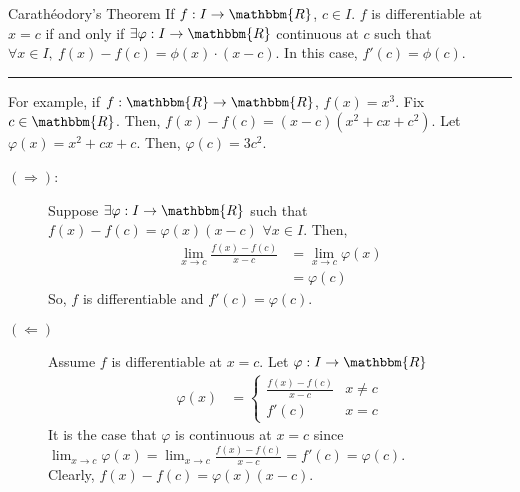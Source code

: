 \documentclass[10pt]{extarticle}
\newcommand{\R}{\mathbbm{R}}
\begin{document}
  \begin{problem}{Carathéodory's Theorem}
    If $f: I\rightarrow \R$, $c\in I$. $f$ is differentiable at $x=c$ if and only if $\exists \varphi: I\rightarrow \R$ continuous at $c$ such that $\forall x\in I,~f(x) - f(c) = \phi(x) \cdot (x-c)$. In this case, $f'(c) = \phi(c)$.\\
    \vspace{4pt}
    \rule{\textwidth}{0.4pt}
    \vspace{4pt}
    For example, if $f: \R\rightarrow \R$, $f(x) = x^3$. Fix $c\in\R$. Then, $f(x) - f(c) = (x-c)(x^2 + cx + c^2)$. Let $\varphi(x) = x^2 + cx + c$. Then, $\varphi(c) = 3c^2$.
    \tcblower
    \begin{description}
      \item[$(\Rightarrow)$:] Suppose $\exists \varphi: I\rightarrow \R$ such that $f(x) - f(c) = \varphi(x)(x-c)$ $\forall x\in I$. Then,
        \begin{align*}
          \lim_{x\rightarrow c}\frac{f(x) - f(c)}{x-c} &= \lim_{x\rightarrow c} \varphi(x)\\
                                                       &= \varphi(c)
        \end{align*}
        So, $f$ is differentiable and $f'(c) = \varphi(c)$.
      \item[$(\Leftarrow)$] Assume $f$ is differentiable at $x=c$. Let $\varphi: I\rightarrow \R$
        \begin{align*}
          \varphi(x) &= \begin{cases}
            \frac{f(x) - f(c)}{x-c} & x\neq c\\
            f'(c) & x = c
          \end{cases}
        \end{align*}
        It is the case that $\varphi$ is continuous at $x=c$ since $\lim_{x\rightarrow c}\varphi(x) = \lim_{x\rightarrow c}\frac{f(x) - f(c)}{x-c} = f'(c) = \varphi(c)$.\\

        Clearly, $f(x) - f(c) = \varphi(x) (x-c)$.
    \end{description}
  \end{problem}
\end{document}
